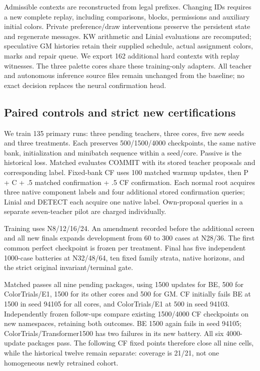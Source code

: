 Admissible contexts are reconstructed from legal prefixes. Changing IDs
requires a new complete replay, including comparisons, blocks,
permissions and auxiliary initial colors. Private preference/draw
interventions preserve the persistent state and regenerate messages. KW
arithmetic and Linial evaluations are recomputed; speculative GM
histories retain their supplied schedule, actual assignment colors,
marks and repair queue. We export 162 additional hard contexts with
replay witnesses. The three palette cores share these training-only
adapters. All teacher and autonomous inference source files remain
unchanged from the baseline; no exact decision replaces the neural
confirmation head.

\subsection{Paired controls and strict new
certifications}\label{paired-controls-and-strict-new-certifications}

We train 135 primary runs: three pending teachers, three cores, five new
seeds and three treatments. Each preserves 500/1500/4000 checkpoints,
the same native bank, initialization and minibatch sequence within a
seed/core. Passive is the historical loss. Matched evaluates COMMIT with
its stored teacher proposals and corresponding label. Fixed-bank CF uses
100 matched warmup updates, then P + C + .5 matched confirmation + .5 CF
confirmation. Each normal root acquires three native component labels
and four additional stored confirmation queries; Linial and DETECT each
acquire one native label. Own-proposal queries in a separate
seven-teacher pilot are charged individually.

Training uses N8/12/16/24. An amendment recorded before the additional
screen and all new finals expands development from 60 to 300 cases at
N28/36. The first common perfect checkpoint is frozen per treatment.
Final has five independent 1000-case batteries at N32/48/64, ten fixed
family strata, native horizons, and the strict original
invariant/terminal gate.

Matched passes all nine pending packages, using 1500 updates for BE, 500
for ColorTrials/E1, 1500 for its other cores and 500 for GM. CF
initially fails BE at 1500 in seed 94105 for all cores, and
ColorTrials/E1 at 500 in seed 94103. Independently frozen follow-ups
compare existing 1500/4000 CF checkpoints on new namespaces, retaining
both outcomes. BE 1500 again fails in seed 94105;
ColorTrials/Transformer1500 has two failures in its new battery. All six
4000-update packages pass. The following CF fixed points therefore close
all nine cells, while the historical twelve remain separate: coverage is
21/21, not one homogeneous newly retrained cohort.

